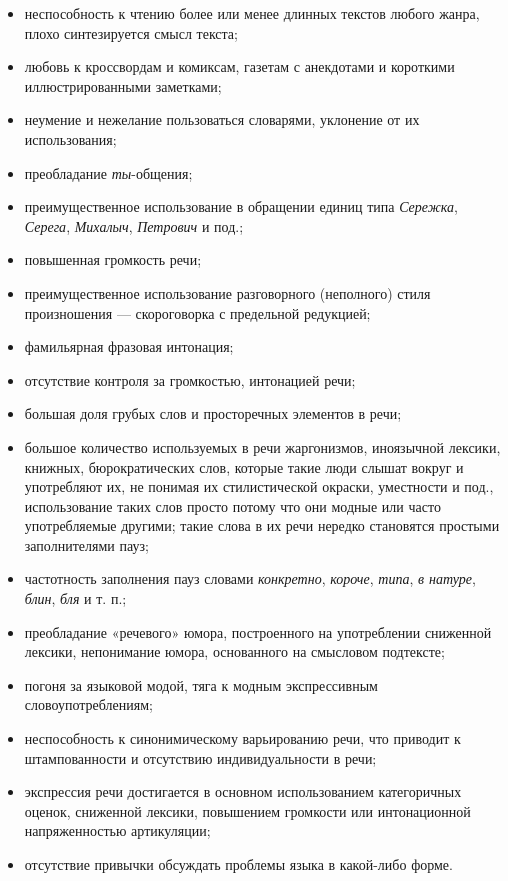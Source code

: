 \begin{itemize}
    \item неспособность к чтению более или менее длинных текстов любого жанра, плохо синтезируется смысл текста;
    \item любовь к кроссвордам и комиксам, газетам с анекдотами и короткими иллюстрированными заметками;
    \item неумение и нежелание пользоваться словарями, уклонение от их использования;
    \item преобладание \textit{ты}-общения;
    \item преимущественное использование в обращении единиц типа \textit{Сережка}, \textit{Серега}, \textit{Михалыч}, \textit{Петрович} и под.;
    \item повышенная громкость речи;
    \item преимущественное использование разговорного (неполного) стиля произношения --- скороговорка с предельной редукцией;
    \item фамильярная фразовая интонация;
    \item отсутствие контроля за громкостью, интонацией речи;
    \item большая доля грубых слов и просторечных элементов в речи;
    \item большое количество используемых в речи жаргонизмов, иноязычной лексики, книжных, бюрократических слов, которые такие люди слышат вокруг и употребляют их, не понимая их стилистической окраски, уместности и под., использование таких слов просто потому что они модные или часто употребляемые другими; такие слова в их речи нередко становятся простыми заполнителями пауз;
    \item частотность заполнения пауз словами \textit{конкретно}, \textit{короче}, \textit{типа}, \textit{в натуре}, \textit{блин}, \textit{бля} и т. п.;
    \item преобладание «речевого» юмора, построенного на употреблении сниженной лексики, непонимание юмора, основанного на смысловом подтексте;
    \item погоня за языковой модой, тяга к модным экспрессивным словоупотреблениям;
    \item неспособность к синонимическому варьированию речи, что приводит к штампованности и отсутствию индивидуальности в речи;
    \item экспрессия речи достигается в основном использованием категоричных оценок, сниженной лексики, повышением громкости или интонационной напряженностью артикуляции;
    \item отсутствие привычки обсуждать проблемы языка в какой-либо форме.
\end{itemize}
